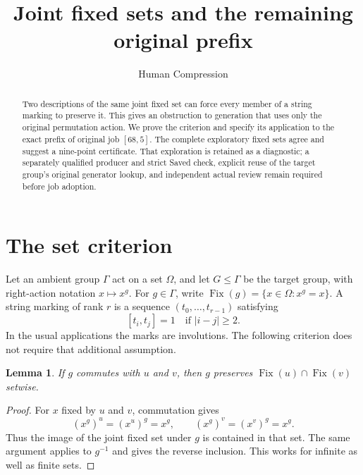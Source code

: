 \documentclass[11pt]{article}
\newtheorem{lemma}[theorem]{Lemma}
\newcommand{\Fix}{\operatorname{Fix}}
\begin{document}
\title{Joint fixed sets and the remaining original prefix}
\author{Human Compression}
\date{}
\maketitle

\begin{abstract}
Two descriptions of the same joint fixed set can force every member
of a string marking to preserve it. This gives an obstruction to
generation that uses only the original permutation action. We prove
the criterion and specify its application to the exact prefix of
original job $[68,5]$. The complete exploratory fixed sets agree and
suggest a nine-point certificate. That exploration is retained as a
diagnostic; a separately qualified producer and strict Saved check,
explicit reuse of the target group's original generator lookup, and independent
actual review remain required before job adoption.
\end{abstract}

\section{The set criterion}

Let an ambient group $\Gamma$ act on a set $\Omega$, and let
$G\leq\Gamma$ be the target group, with right-action notation
$x\mapsto x^g$. For $g\in\Gamma$, write
$\Fix(g)=\{x\in\Omega:x^g=x\}$. A string marking of rank $r$
is a sequence $(t_0,\ldots,t_{r-1})$ satisfying
\[
                  [t_i,t_j]=1\quad\text{if }|i-j|\geq2.
\]
In the usual applications the marks are involutions. The following
criterion does not require that additional assumption.

\begin{lemma}\label{lem:centralizer}
If $g$ commutes with $u$ and $v$, then $g$ preserves
$\Fix(u)\cap\Fix(v)$ setwise.
\end{lemma}
\begin{proof}
For $x$ fixed by $u$ and $v$, commutation gives
\[
        (x^g)^u=(x^u)^g=x^g,\qquad
        (x^g)^v=(x^v)^g=x^g.
\]
Thus the image of the joint fixed set under $g$ is contained in
that set. The same argument applies to $g^{-1}$ and gives the reverse
inclusion. This works for infinite as well as finite sets.
\end{proof}
\end{document}
